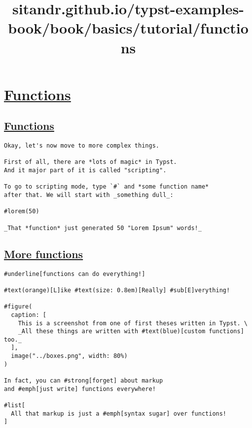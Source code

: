 \title{sitandr.github.io/typst-examples-book/book/basics/tutorial/functions}

\section{\texorpdfstring{\hyperref[functions]{Functions}}{Functions}}\label{functions}

\subsection{\texorpdfstring{\hyperref[functions-1]{Functions}}{Functions}}\label{functions-1}

\begin{verbatim}
Okay, let's now move to more complex things.

First of all, there are *lots of magic* in Typst.
And it major part of it is called "scripting".

To go to scripting mode, type `#` and *some function name*
after that. We will start with _something dull_:

#lorem(50)

_That *function* just generated 50 "Lorem Ipsum" words!_
\end{verbatim}

\pandocbounded{}

\subsection{\texorpdfstring{\hyperref[more-functions]{More
functions}}{More functions}}\label{more-functions}

\begin{verbatim}
#underline[functions can do everything!]

#text(orange)[L]ike #text(size: 0.8em)[Really] #sub[E]verything!

#figure(
  caption: [
    This is a screenshot from one of first theses written in Typst. \
    _All these things are written with #text(blue)[custom functions] too._
  ],
  image("../boxes.png", width: 80%)
)

In fact, you can #strong[forget] about markup
and #emph[just write] functions everywhere!

#list[
  All that markup is just a #emph[syntax sugar] over functions!
]
\end{verbatim}

